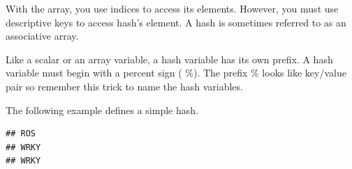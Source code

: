 \documentclass[]{book}
\makeatletter
\newenvironment{Shaded}{\begin{snugshade}}{\end{snugshade}}
\newcommand{\CharTok}[1]{\textcolor[rgb]{0.31,0.60,0.02}{#1}}
\newcommand{\CommentTok}[1]{\textcolor[rgb]{0.56,0.35,0.01}{\textit{#1}}}
\newcommand{\DataTypeTok}[1]{\textcolor[rgb]{0.13,0.29,0.53}{#1}}
\newcommand{\FunctionTok}[1]{\textcolor[rgb]{0.00,0.00,0.00}{#1}}
\newcommand{\KeywordTok}[1]{\textcolor[rgb]{0.13,0.29,0.53}{\textbf{#1}}}
\newcommand{\NormalTok}[1]{#1}
\newcommand{\StringTok}[1]{\textcolor[rgb]{0.31,0.60,0.02}{#1}}
\newenvironment{kframe}{%
\medskip{}
\setlength{\fboxsep}{.8em}
 \def\at@end@of@kframe{}%
 \ifinner\ifhmode%
  \def\at@end@of@kframe{\end{minipage}}%
  \begin{minipage}{\columnwidth}%
 \fi\fi%
 \def\FrameCommand##1{\hskip\@totalleftmargin \hskip-\fboxsep
 \colorbox{shadecolor}{##1}\hskip-\fboxsep
     \hskip-\linewidth \hskip-\@totalleftmargin \hskip\columnwidth}%
 \MakeFramed {\advance\hsize-\width
   \@totalleftmargin\z@ \linewidth\hsize
   \@setminipage}}%
 {\par\unskip\endMakeFramed%
 \at@end@of@kframe}
\renewenvironment{Shaded}{\begin{kframe}}{\end{kframe}}
\makeatother
\begin{document}
With the array, you use indices to access its elements. However, you must use descriptive keys to access hash's element. A hash is sometimes referred to as an associative array.

Like a scalar or an array variable, a hash variable has its own prefix. A hash variable must begin with a percent sign ( \%). The prefix \% looks like key/value pair so remember this trick to name the hash variables.

The following example defines a simple hash.

\begin{Shaded}
\end{Shaded}

\begin{verbatim}
## ROS
## WRKY
## WRKY
\end{verbatim}

\begin{Shaded}
\end{Shaded}
\end{document}

